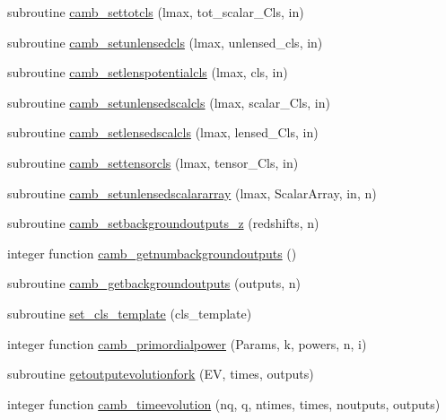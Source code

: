 \begin{DoxyCompactItemize}
subroutine \mbox{\hyperlink{namespacehandles_aa9ec681801ce104b28add54fd9ee3d16}{camb\+\_\+settotcls}} (lmax, tot\+\_\+scalar\+\_\+\+Cls, in)
\item 
subroutine \mbox{\hyperlink{namespacehandles_a275c2c9c895b79f63eef42b7fe81c842}{camb\+\_\+setunlensedcls}} (lmax, unlensed\+\_\+cls, in)
\item 
subroutine \mbox{\hyperlink{namespacehandles_ae3fb31c2363d57d05718b6cb9bc6bf5d}{camb\+\_\+setlenspotentialcls}} (lmax, cls, in)
\item 
subroutine \mbox{\hyperlink{namespacehandles_a8a98a8d5a48c920afe02832367244648}{camb\+\_\+setunlensedscalcls}} (lmax, scalar\+\_\+\+Cls, in)
\item 
subroutine \mbox{\hyperlink{namespacehandles_a670ac8cb259c4983bc0cb16b053252b7}{camb\+\_\+setlensedscalcls}} (lmax, lensed\+\_\+\+Cls, in)
\item 
subroutine \mbox{\hyperlink{namespacehandles_a85a90c13c4ff2c1dc02dd5b6c6c8da9d}{camb\+\_\+settensorcls}} (lmax, tensor\+\_\+\+Cls, in)
\item 
subroutine \mbox{\hyperlink{namespacehandles_ad9c5c14a68ab016e4b976c1f3f665779}{camb\+\_\+setunlensedscalararray}} (lmax, Scalar\+Array, in, n)
\item 
subroutine \mbox{\hyperlink{namespacehandles_a4f9beee6e16e46b574ad807258bca56c}{camb\+\_\+setbackgroundoutputs\+\_\+z}} (redshifts, n)
\item 
integer function \mbox{\hyperlink{namespacehandles_a67c4066d5a6fa655910d3dc0fc295419}{camb\+\_\+getnumbackgroundoutputs}} ()
\item 
subroutine \mbox{\hyperlink{namespacehandles_a8c6d226c983d217554ce7208a52f6684}{camb\+\_\+getbackgroundoutputs}} (outputs, n)
\item 
subroutine \mbox{\hyperlink{namespacehandles_a9622707d668c5bb52a241302010db94f}{set\+\_\+cls\+\_\+template}} (cls\+\_\+template)
\item 
integer function \mbox{\hyperlink{namespacehandles_a694425016cc091db331b30804819bca8}{camb\+\_\+primordialpower}} (Params, k, powers, n, i)
\item 
subroutine \mbox{\hyperlink{namespacehandles_abde0c82099eadde40e5f09d895ec6ebb}{getoutputevolutionfork}} (EV, times, outputs)
\item 
integer function \mbox{\hyperlink{namespacehandles_a0d801cc8883d8e64021e9a4703f5ac63}{camb\+\_\+timeevolution}} (nq, q, ntimes, times, noutputs, outputs)
\end{DoxyCompactItemize}


